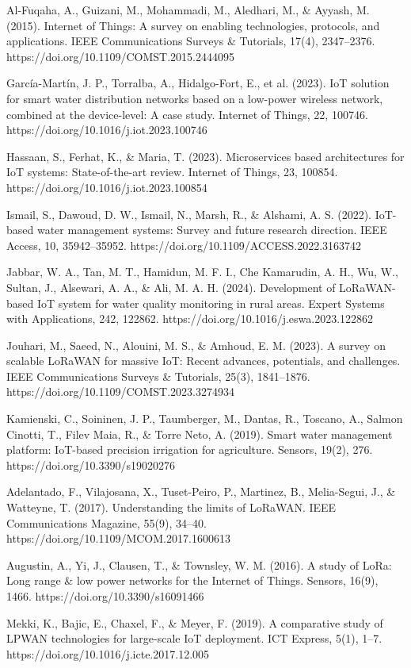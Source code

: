 \documentclass[12pt,a4paper,oneside]{report}
\begin{document}
Al-Fuqaha, A., Guizani, M., Mohammadi, M., Aledhari, M., \& Ayyash, M. (2015). Internet of Things: A survey on enabling technologies, protocols, and applications. IEEE Communications Surveys \& Tutorials, 17(4), 2347--2376. https://doi.org/10.1109/COMST.2015.2444095

García-Martín, J. P., Torralba, A., Hidalgo-Fort, E., et al. (2023). IoT solution for smart water distribution networks based on a low-power wireless network, combined at the device-level: A case study. Internet of Things, 22, 100746. https://doi.org/10.1016/j.iot.2023.100746

Hassaan, S., Ferhat, K., \& Maria, T. (2023). Microservices based architectures for IoT systems: State-of-the-art review. Internet of Things, 23, 100854. https://doi.org/10.1016/j.iot.2023.100854

Ismail, S., Dawoud, D. W., Ismail, N., Marsh, R., \& Alshami, A. S. (2022). IoT-based water management systems: Survey and future research direction. IEEE Access, 10, 35942--35952. https://doi.org/10.1109/ACCESS.2022.3163742

Jabbar, W. A., Tan, M. T., Hamidun, M. F. I., Che Kamarudin, A. H., Wu, W., Sultan, J., Alsewari, A. A., \& Ali, M. A. H. (2024). Development of LoRaWAN-based IoT system for water quality monitoring in rural areas. Expert Systems with Applications, 242, 122862. https://doi.org/10.1016/j.eswa.2023.122862

Jouhari, M., Saeed, N., Alouini, M. S., \& Amhoud, E. M. (2023). A survey on scalable LoRaWAN for massive IoT: Recent advances, potentials, and challenges. IEEE Communications Surveys \& Tutorials, 25(3), 1841--1876. https://doi.org/10.1109/COMST.2023.3274934

Kamienski, C., Soininen, J. P., Taumberger, M., Dantas, R., Toscano, A., Salmon Cinotti, T., Filev Maia, R., \& Torre Neto, A. (2019). Smart water management platform: IoT-based precision irrigation for agriculture. Sensors, 19(2), 276. https://doi.org/10.3390/s19020276

Adelantado, F., Vilajosana, X., Tuset-Peiro, P., Martinez, B., Melia-Segui, J., \& Watteyne, T. (2017). Understanding the limits of LoRaWAN. IEEE Communications Magazine, 55(9), 34--40. https://doi.org/10.1109/MCOM.2017.1600613

Augustin, A., Yi, J., Clausen, T., \& Townsley, W. M. (2016). A study of LoRa: Long range \& low power networks for the Internet of Things. Sensors, 16(9), 1466. https://doi.org/10.3390/s16091466

Mekki, K., Bajic, E., Chaxel, F., \& Meyer, F. (2019). A comparative study of LPWAN technologies for large-scale IoT deployment. ICT Express, 5(1), 1--7. https://doi.org/10.1016/j.icte.2017.12.005
\end{document}
